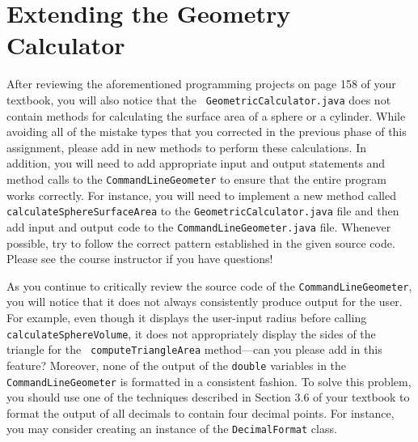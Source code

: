 \documentclass[11pt]{article}
\newcommand{\command}[1]{``\lstinline{#1}''}
\begin{document}

\section*{Extending the Geometry Calculator}

\begin{sloppypar}
  After reviewing the aforementioned programming projects on page 158 of your textbook, you will also notice that the {\tt
  GeometricCalculator.java} does not contain methods for calculating the surface area of a sphere or a cylinder. While
  avoiding all of the mistake types that you corrected in the previous phase of this assignment, please add in new methods
  to perform these calculations. In addition, you will need to add appropriate input and output statements and method
  calls to the {\tt CommandLineGeometer} to ensure that the entire program works correctly. For instance, you will need to
  implement a new method called {\tt calculateSphereSurfaceArea} to the {\tt GeometricCalculator.java} file and then add
  input and output code to the {\tt CommandLineGeometer.java} file. Whenever possible, try to follow the correct
  pattern established in the given source code. Please see the course instructor if you have questions!
\end{sloppypar}

As you continue to critically review the source code of the {\tt CommandLineGeometer}, you will notice that it does not
always consistently produce output for the user. For example, even though it displays the user-input radius before
calling {\tt calculateSphereVolume}, it does not appropriately display the sides of the triangle for the {\tt
computeTriangleArea} method---can you please add in this feature? Moreover, none of the output of the {\tt double}
variables in the {\tt CommandLineGeometer} is formatted in a consistent fashion. To solve this problem, you should use
one of the techniques described in Section 3.6 of your textbook to format the output of all decimals to contain four
decimal points. For instance, you may consider creating an instance of the {\tt DecimalFormat} class.
\end{document}
